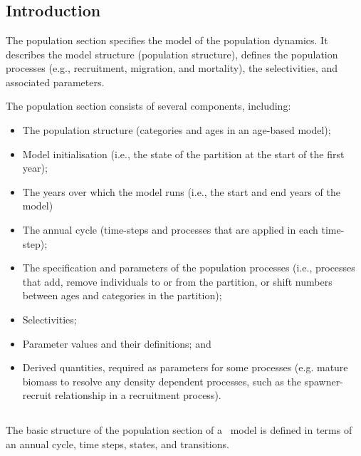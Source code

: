 \section{\label{sec:population-section}}

\subsection{Introduction}
The population section specifies the model of the population dynamics. It describes the model structure (population structure), defines the population processes (e.g., recruitment, migration, and mortality), the selectivities, and associated parameters.

The population section consists of several components, including:
\begin{itemize}
  \item The population structure (categories and ages in an age-based model);
  \item Model initialisation (i.e., the state of the partition at the start of the first year);
  \item The years over which the model runs (i.e., the start and end years of the model)
  \item The annual cycle (time-steps and processes that are applied in each time-step);
  \item The specification and parameters of the population processes (i.e., processes that add, remove individuals to or from the partition, or shift numbers between ages and categories in the partition);
  \item Selectivities;
  \item Parameter values and their definitions; and
  \item Derived quantities, required as parameters for some processes (e.g. mature biomass to resolve any density dependent processes, such as the spawner-recruit relationship in a recruitment process).
\end{itemize}

\subsection{}\label{sub:sec:pop_sec}
The basic structure of the population section of a \CNAME\ model is defined in terms of an annual cycle, time steps, states, and transitions.

